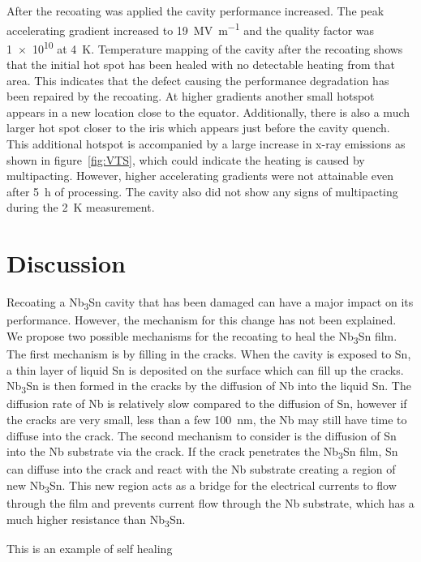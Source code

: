 \documentclass{revtex4-2}
\begin{document}
After the recoating was applied the cavity performance increased. The peak accelerating gradient increased to \qty{19}{\mega\volt\per\meter} and the quality factor was \num{1e10} at \qty{4}{\kelvin}. Temperature mapping of the cavity after the recoating shows that the initial hot spot has been healed with no detectable heating from that area. This indicates that the defect causing the performance degradation has been repaired by the recoating. At higher gradients another small hotspot appears in a new location close to the equator. Additionally, there is also a much larger hot spot closer to the iris which appears just before the cavity quench. This additional hotspot is accompanied by a large increase in x-ray emissions as shown in figure~\ref{fig:VTS}, which could indicate the heating is caused by multipacting. However, higher accelerating gradients were not attainable even after \qty{5}{\hour} of processing. The cavity also did not show any signs of multipacting during the \qty{2}{\kelvin} measurement.



\section*{Discussion}
\label{sec:Discussion}

Recoating a Nb\textsubscript{3}Sn cavity that has been damaged can have a major impact on its performance. However, the mechanism for this change has not been explained. We propose two possible mechanisms for the recoating to heal the Nb\textsubscript{3}Sn film. The first mechanism is by filling in the cracks. When the cavity is exposed to Sn, a thin layer of liquid Sn is deposited on the surface which can fill up the cracks. Nb\textsubscript{3}Sn is then formed in the cracks by the diffusion of Nb into the liquid Sn. The diffusion rate of Nb is relatively slow compared to the diffusion of Sn, however if the cracks are very small, less than a few \qty{100}{nm}, the Nb may still have time to diffuse into the crack. The second mechanism to consider is the diffusion of Sn into the Nb substrate via the crack. If the crack penetrates the Nb\textsubscript{3}Sn film, Sn can diffuse into the crack and react with the Nb substrate creating a region of new Nb\textsubscript{3}Sn. This new region acts as a bridge for the electrical currents to flow through the film and prevents current flow through the Nb substrate, which has a much higher resistance than Nb\textsubscript{3}Sn. 

This is an example of self healing\cite{Sloof2007}
\end{document}
